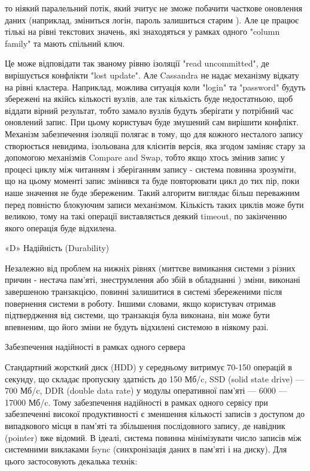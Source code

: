 \documentclass[14pt]{vakthesis}
\begin{document}
то ніякий паралельний потік, який зчитує не зможе побачити часткове оновлення даних (наприклад, зміниться логін, пароль залишиться старим ). Але це працює тількі на рівні текстових значень, які знаходяться у рамках одного  "column family" та мають спільний ключ.

Це може відповідати так званому рівню ізоляції "read uncommitted", де вирішується конфлікти "lost update".
Але Cassandra не надає механізму відкату на рівні кластера. Наприклад, можлива ситуація коли "login" та "password" будуть збережені
на якійсь кількості вузлів, але так кількість буде недостатньою, щоб віддати вірний результат, тобто замало вузлів будуть зберігати
у потрібний час оновлений запис. При цьому користувач буде змушений сам вирішити конфлікт.
Механізм забезпечення ізоляції полягає в тому, що для кожного несталого запису створюється невидима, ізольована для клієнтів версія,
яка згодом заміняє стару за допомогою механізмів Compare and Swap, тобто якщо хтось змінив запис у процесі циклу між читанням і зберіганням запису - система повинна зрозуміти, що на цьому моменті запис змінився та буде повторювати цикл до тих пір, поки наше значення не буде збереженим. Такий алгоритм виглядає більш переважним перед повністю блокуючим записи механізмом. 
Кількість таких циклів може бути великою, тому на такі операції виставляється деякий timeout, по закінченню якого операція буде відхилена.

«D» Надійність (Durability)

Незалежно від проблем на нижніх рівнях (миттєве вимикання системи з різних причин - нестача пам'яті, 
знеструмлення або збій в обладнанні ) зміни, виконані завершеною транзакцією, повинні залишитися в системі збереженими після повернення системи в роботу. Іншими словами, якщо користувач отримав підтвердження від системи, що транзакція була виконана, він може бути впевненим, що його зміни не будуть відхилені системою в ніякому разі.

Забезпечення надійності в рамках одного сервера


Стандартний жорсткий диск (HDD) у середньому витримує 70-150 операцій в секунду, що складає пропускну здатність до 150 Мб/c, 
SSD (solid state drive) — 700 Мб/c, DDR (double data rate) у модулы оперативної пам'яті — 6000 — 17000 Мб/c. 
Тому забезпечення надійності в рамках одного сервісу при забезпеченні високої продуктивності є зменшення кількості записів з 
доступом до випадкового місця в пам'яті та збільшення послідовного запису, де навідник (pointer) вже відомий.
В ідеалі, система повинна мінімізувати число записів між системними виклаками fsync (синхронізація даних в пам'яті і на диску).
Для цього застосовують декалька технік:
\end{document}
